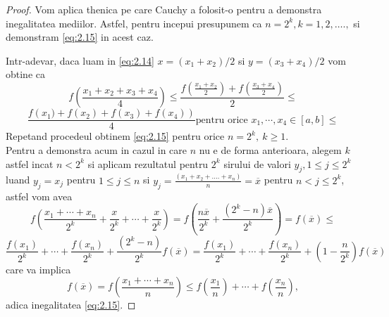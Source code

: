 \documentclass[a4paper,12pt,oneside]{report}
\begin{document}
\begin{proof}
Vom aplica thenica pe care Cauchy a folosit-o pentru a demonstra inegalitatea mediilor. Astfel, pentru incepui presupunem ca \(n = 2^{k}, k=1,2,….,\) si demonstram \ref{eq:2.15} in acest caz.

Intr-adevar, daca luam in \ref{eq:2.14} $x=(x_1+x_2)/2$ si $y=(x_3+x_4)/2$ vom obtine ca
\begin{equation*}
  f\left ( \frac{x_1 + x_2+x_3+x_4}{4} \right ) \leq \frac{f\left ( \frac{x_1 + x_2}{2} \right) + f\left(\frac{x_3 + x_4}{2} \right )}{2} \leq
\end{equation*}
\begin{equation*}
   \frac{f\left (x_1) + f\left (x_2 \right )+f\left (x_3 \right )+f\left (x_4 \right ) \right)}{4} \text{pentru orice } x_1, \cdots, x_4 \in \left [ a, b \right ]\leq
\end{equation*}
Repetand procedeul obtinem \ref{eq:2.15} pentru orice $n=2^k,~k\geq 1.$\\
 Pentru a demonstra acum in cazul in care $n$ nu e de forma anterioara, alegem  \(k\) astfel incat \(n< 2^{k}\) si aplicam rezultatul pentru \(2^{k}\) sirului de valori \(y_{j} , 1\leq j\leq 2^{k}\) luand \(y_{j} = x_{j}\) pentru \(1\leq j\leq n \) si \(y_{j} = \frac{\left ( x_{1} + x_{2} + ....+ x_{n} \right )}{n}=\overline{x}\) pentru \(n< j\leq 2^{k}\), astfel vom avea
 \[
   f\left ( \frac{x_1 + \cdots+x_n}{2^k}+\frac{x}{2^k}+\cdots+\frac{x}{2^k} \right )=f\left( \frac{n \overline{x}}{2^k}+\frac{(2^k-n) \overline{x}}{2^k}\right)=f(\overline{x}) \leq
 \]
 \[
\frac{ f(x_1)}{2^k}+\cdots+\frac{ f(x_n)}{2^k}+\frac{(2^k-n)}{2^k}f(\overline{x})=\frac{ f(x_1)}{2^k}+\cdots+\frac{ f(x_n)}{2^k}+ (1-\frac{n}{2^k})f(\overline{x})
 \]
 care va implica
 \[
 f(\overline{x})=  f\left ( \frac{x_1 + \cdots+x_n}{n} \right )\leq f\left ( \frac{x_1}{n} \right )+\cdots+f\left ( \frac{x_n}{n} \right ),
 \]
 adica inegalitatea \ref{eq:2.15}.
\end{proof}
\end{document}
